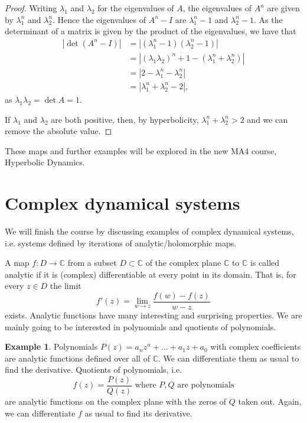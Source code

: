 \documentclass[12pt]{article}
\theoremstyle{definition}
\newtheorem{example}[theorem]{Example}
\theoremstyle{remark}
\begin{document}
\begin{proof}
Writing
$\lambda_{1}$ and $ \lambda_{2}$ for the eigenvalues of $A$, the eigenvalues of
$A^{n}$ are given by $\lambda_{1}^{n}$ and $\lambda_{2}^{n}$.  Hence the
eigenvalues of $A^{n}-I$ are $\lambda_{1}^{n}-1$ and  $\lambda_{2}^{n}-1$.
As the determinant of a matrix is given by the product of the
eigenvalues, we have that 
\begin{align*}
 |\det (A^{n}-I)| &=  | (\lambda_{1}^{n}-1)(\lambda_{2}^{n}-1)| \\
 &= 
 |(\lambda_{1}\lambda_{2})^{n}+1 -(\lambda_{1}^{n}+\lambda_{2}^{n})| \\
 &= 
|2- \lambda_{1}^{n} - \lambda_{2}^{n}|
\\
&= 
|\lambda_1^n + \lambda_2^n -2|,
\end{align*}
as $\lambda_{1}\lambda_{2} = \det A = 1$.

If $\lambda_1$ and $\lambda_2$ are both positive, then, by hyperbolicity, 
$\lambda_1^n + \lambda_2^n>2$ and we can remove the absolute value.
\end{proof}

These maps and further examples will be explored in the new MA4 course, Hyperbolic Dynamics.
\newpage


\section{Complex dynamical systems}
We will finish the course by discussing examples of complex dynamical systems, i.e. systems defined by iterations of analytic/holomorphic maps.

A map $f: D \to \mathbb{C}$ from a subset $D \subset \mathbb{C}$ of the complex plane $\mathbb{C}$ to $\mathbb{C}$ is called analytic if it is (complex) differentiable at every point in its domain. That is, for every $z \in D$ the limit
\[
f'(z) = \lim_{w \to z} \frac{f(w) -f(z)}{w-z}
\]
exists. Analytic functions have many interesting and surprising properties. 
We are mainly going to be interested in polynomials and quotients of polynomials.
\begin{example}
Polynomials $P(z) = a_nz^n + \ldots + a_1 z + a_0$ with complex coefficients are analytic functions defined over all of $\mathbb{C}$. We can differentiate them as usual to find the derivative. Quotients of polynomials, i.e.
\[
f(z) = \frac{P(z)}{Q(z)} \text{ where $P,Q$ are polynomials}
\]
are analytic functions on the complex plane with the zeros of $Q$ taken out. Again, we can differentiate $f$ as usual to find its derivative.
\end{example}
\end{document}

